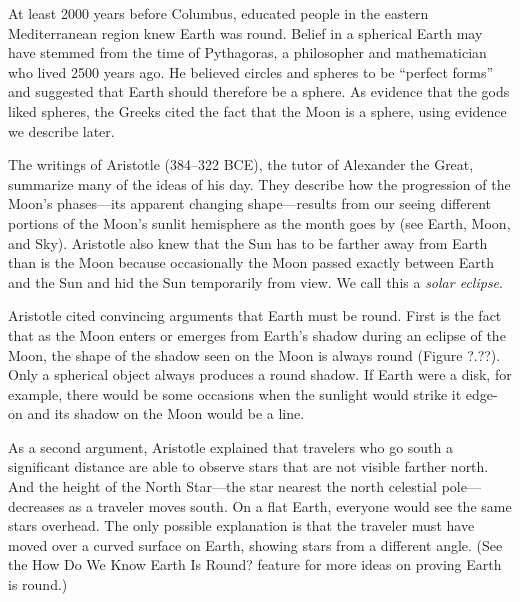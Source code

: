 \documentclass[../../main-astronomy.tex]{subfiles}
\begin{document}
\vspace{1em}

At least 2000 years before Columbus, educated people in the eastern Mediterranean region knew Earth was round. Belief in a spherical Earth may have stemmed from the time of Pythagoras, a philosopher and mathematician who lived 2500 years ago. He believed circles and spheres to be ``perfect forms'' and suggested that Earth should therefore be a sphere. As evidence that the gods liked spheres, the Greeks cited the fact that the Moon is a sphere, using evidence we describe later.

\vspace{1em}

The writings of Aristotle (384--322 BCE), the tutor of Alexander the Great, summarize many of the ideas of his day. They describe how the progression of the Moon's phases---its apparent changing shape---results from our seeing different portions of the Moon's sunlit hemisphere as the month goes by (see Earth, Moon, and Sky). Aristotle also knew that the Sun has to be farther away from Earth than is the Moon because occasionally the Moon passed exactly between Earth and the Sun and hid the Sun temporarily from view. We call this a \textit{solar eclipse}.

\vspace{1em}

Aristotle cited convincing arguments that Earth must be round. First is the fact that as the Moon enters or emerges from Earth's shadow during an eclipse of the Moon, the shape of the shadow seen on the Moon is always round (Figure ?.??). Only a spherical object always produces a round shadow. If Earth were a disk, for example, there would be some occasions when the sunlight would strike it edge-on and its shadow on the Moon would be a line.


\vspace{1em}

As a second argument, Aristotle explained that travelers who go south a significant distance are able to observe stars that are not visible farther north. And the height of the North Star---the star nearest the north celestial pole---decreases as a traveler moves south. On a flat Earth, everyone would see the same stars overhead. The only possible explanation is that the traveler must have moved over a curved surface on Earth, showing stars from a different angle. (See the How Do We Know Earth Is Round? feature for more ideas on proving Earth is round.)
\end{document}
